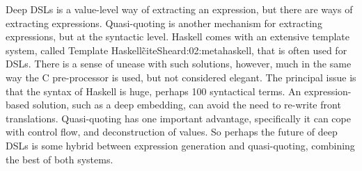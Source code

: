 \documentclass[11pt]{article}
\begin{document}
Deep DSLs is a value-level way of extracting an expression, but there are ways of
extracting expressions.
Quasi-quoting is another mechanism for extracting expressions, but at the syntactic level. 
Haskell comes with an extensive template system, called Template Haskell\~cite{Sheard:02:metahaskell}, 
that is often used for DSLs. There is a sense of unease with such solutions, however, much
in the same way the C pre-processor is used, but not considered elegant. The principal issue
is that the syntax of Haskell is huge, perhaps 100 syntactical terms. An expression-based
solution, such as a deep embedding, can avoid the need to re-write front translations.
Quasi-quoting has one important advantage, specifically it can cope with control flow,
and deconstruction of values. So perhaps the future of deep DSLs is some hybrid between
expression generation and quasi-quoting, combining the best of both systems.

{}

\end{document}
